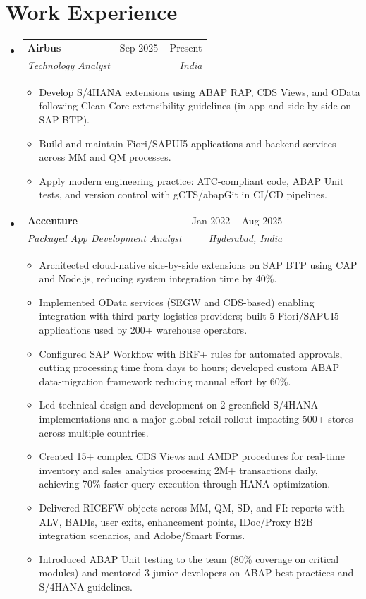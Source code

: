 \documentclass[letterpaper,11pt]{article}
\makeatletter
\newcommand{\resumeItem}[1]{
  \item\small{
    {#1 \vspace{-2pt}}
  }
}
\newcommand{\resumeSubheading}[4]{
  \vspace{-2pt}\item
    \begin{tabular*}{0.97\textwidth}[t]{l@{\extracolsep{\fill}}r}
      \textbf{#1} & #2 \\
      \textit{\small#3} & \textit{\small #4} \\
    \end{tabular*}\vspace{-7pt}
}
\newcommand{\resumeSubHeadingListStart}{\begin{itemize}[leftmargin=0.15in, label={}]}
\newcommand{\resumeSubHeadingListEnd}{\end{itemize}}
\newcommand{\resumeItemListStart}{\begin{itemize}}
\newcommand{\resumeItemListEnd}{\end{itemize}\vspace{-5pt}}
\makeatother
\begin{document}
\section{Work Experience}
  \resumeSubHeadingListStart

    \resumeSubheading
      {Airbus}{Sep 2025 -- Present}
      {Technology Analyst}{India}
      \resumeItemListStart
        \resumeItem{Develop S/4HANA extensions using ABAP RAP, CDS Views, and OData following Clean Core extensibility guidelines (in-app and side-by-side on SAP BTP).}
        \resumeItem{Build and maintain Fiori/SAPUI5 applications and backend services across MM and QM processes.}
        \resumeItem{Apply modern engineering practice: ATC-compliant code, ABAP Unit tests, and version control with gCTS/abapGit in CI/CD pipelines.}
      \resumeItemListEnd

    \resumeSubheading
      {Accenture}{Jan 2022 -- Aug 2025}
      {Packaged App Development Analyst}{Hyderabad, India}
      \resumeItemListStart
        \resumeItem{Architected cloud-native side-by-side extensions on SAP BTP using CAP and Node.js, reducing system integration time by 40\%.}
        \resumeItem{Implemented OData services (SEGW and CDS-based) enabling integration with third-party logistics providers; built 5 Fiori/SAPUI5 applications used by 200+ warehouse operators.}
        \resumeItem{Configured SAP Workflow with BRF+ rules for automated approvals, cutting processing time from days to hours; developed custom ABAP data-migration framework reducing manual effort by 60\%.}
        \resumeItem{Led technical design and development on 2 greenfield S/4HANA implementations and a major global retail rollout impacting 500+ stores across multiple countries.}
        \resumeItem{Created 15+ complex CDS Views and AMDP procedures for real-time inventory and sales analytics processing 2M+ transactions daily, achieving 70\% faster query execution through HANA optimization.}
        \resumeItem{Delivered RICEFW objects across MM, QM, SD, and FI: reports with ALV, BADIs, user exits, enhancement points, IDoc/Proxy B2B integration scenarios, and Adobe/Smart Forms.}
        \resumeItem{Introduced ABAP Unit testing to the team (80\% coverage on critical modules) and mentored 3 junior developers on ABAP best practices and S/4HANA guidelines.}

      \resumeItemListEnd

  \resumeSubHeadingListEnd

\end{document}

